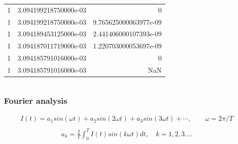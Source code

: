 \documentclass[aspectratio=1610]{beamer}
\begin{document}
\begin{frame}
\begin{columns}
{\begin{tabular}{|r|c|r|}
     1 &     3.094199218750000e-03 &                        0\\
     1 &     3.094199218750000e-03 &    9.765625000063977e-09\\
     1 &     3.094189453125000e-03 &    2.441406000107393e-09\\
     1 &     3.094187011719000e-03 &    1.220703000053697e-09\\
     1 &     3.094185791016000e-03 &                        0\\
     1 &     3.094185791016000e-03 &                      NaN\\ \hline
     	\end{tabular}}
\end{columns} 
\end{frame}
\begin{frame}
\frametitle{Fourier analysis}
\large
\begin{align*}
I(t)=a_{1}sin(\omega t)+a_{2}sin(2\omega t)+a_{3}sin(3\omega t)+\cdots, \quad  \quad \omega = 2\pi/T\\
\end{align*}
\begin{align*}
a_{k} = \frac{2}{T}\int_{0}^{T} I(t)sin(k\omega t)dt,\quad k=1,2,3....
\end{align*}
\end{frame}
\end{document}
